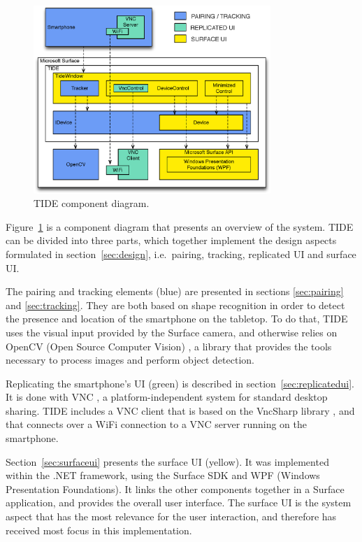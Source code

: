\begin{figure}[htb]
  \centering
    \includegraphics[width=0.8\textwidth]{images/overviewNew}
    \caption{TIDE component diagram.}
    \label{fig:overview}
\end{figure}

Figure~\ref{fig:overview} is a component diagram that presents an overview of the system.
TIDE can be divided into three parts, which together implement the design aspects formulated in section~\ref{sec:design}, i.e.\ pairing, tracking, replicated UI and surface UI.

The pairing and tracking elements (blue) are presented in sections \ref{sec:pairing} and \ref{sec:tracking}.
They are both based on shape recognition in order to detect the presence and location of the smartphone on the tabletop.
To do that, TIDE uses the visual input provided by the Surface camera, and otherwise relies on OpenCV (Open Source Computer Vision) \citep{opencv}, a library that provides the tools necessary to process images and perform object detection.

Replicating the smartphone's UI (green) is described in section~\ref{sec:replicatedui}.
It is done with VNC \citep{Richardson:1998:vnc}, a platform-independent system for standard desktop sharing.
TIDE includes a VNC client that is based on the VncSharp library \citep{vncsharp}, and that connects over a WiFi connection to a VNC server running on the smartphone.

Section~\ref{sec:surfaceui} presents the surface UI (yellow).
It was implemented within the .NET framework, using the Surface SDK and WPF (Windows Presentation Foundations).
It links the other components together in a Surface application, and provides the overall user interface.
The surface UI is the system aspect that has the most relevance for the user interaction, and therefore has received most focus in this implementation.

